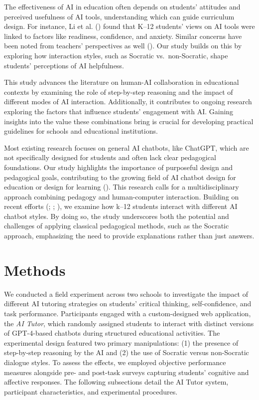 \documentclass[
  11pt,
]{article}
\begin{document}
The effectiveness of AI in education often depends on students' attitudes and perceived usefulness of AI tools, understanding which can guide curriculum design. For instance, Li et al. () found that K--12 students' views on AI tools were linked to factors like readiness, confidence, and anxiety. Similar concerns have been noted from teachers' perspectives as well (). Our study builds on this by exploring how interaction styles, such as Socratic vs.~non-Socratic, shape students' perceptions of AI helpfulness.

This study advances the literature on human-AI collaboration in educational contexts by examining the role of step-by-step reasoning and the impact of different modes of AI interaction. Additionally, it contributes to ongoing research exploring the factors that influence students' engagement with AI. Gaining insights into the value these combinations bring is crucial for developing practical guidelines for schools and educational institutions.

Most existing research focuses on general AI chatbots, like ChatGPT, which are not specifically designed for students and often lack clear pedagogical foundations. Our study highlights the importance of purposeful design and pedagogical goals, contributing to the growing field of AI chatbot design for education or design for learning (). This research calls for a multidisciplinary approach combining pedagogy and human-computer interaction. Building on recent efforts (; ; ), we examine how k--12 students interact with different AI chatbot styles. By doing so, the study underscores both the potential and challenges of applying classical pedagogical methods, such as the Socratic approach, emphasizing the need to provide explanations rather than just answers.

\section{Methods}\label{sec:methods}

We conducted a field experiment across two schools to investigate the impact of different AI tutoring strategies on students' critical thinking, self-confidence, and task performance. Participants engaged with a custom-designed web application, the \emph{AI Tutor}, which randomly assigned students to interact with distinct versions of GPT-4-based chatbots during structured educational activities. The experimental design featured two primary manipulations: (1) the presence of step-by-step reasoning by the AI and (2) the use of Socratic versus non-Socratic dialogue styles. To assess the effects, we employed objective performance measures alongside pre- and post-task surveys capturing students' cognitive and affective responses. The following subsections detail the AI Tutor system, participant characteristics, and experimental procedures.
\end{document}
